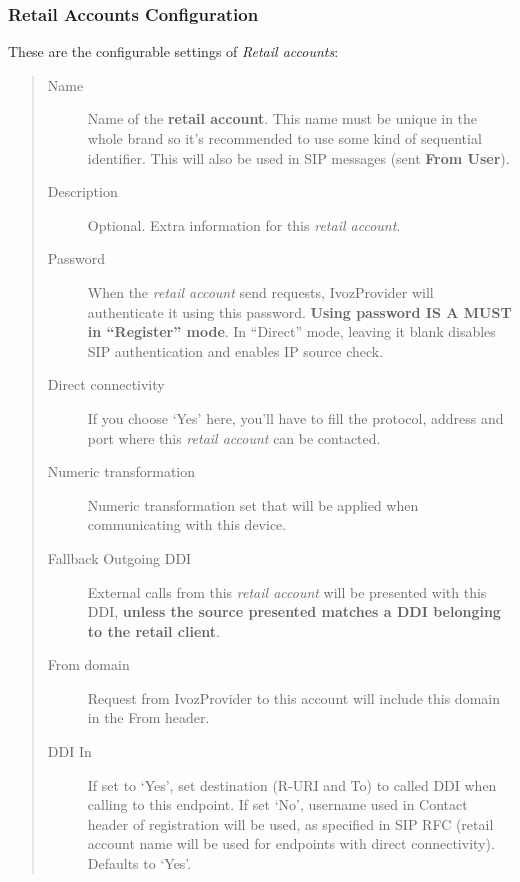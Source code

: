 \documentclass[letterpaper,10pt,spanish]{sphinxmanual}
\begin{document}
\subsubsection{Retail Accounts Configuration}
\label{administration_portal/client/retail/retail_accounts:retail-accounts-configuration}
These are the configurable settings of \emph{Retail accounts}:
\begin{quote}
\begin{description}
\item[{Name}] \leavevmode
Name of the \textbf{retail account}. This name must be unique in the whole brand so
it's recommended to use some kind of sequential identifier. This will also be used
in SIP messages (sent \textbf{From User}).

\item[{Description}] \leavevmode
Optional. Extra information for this \emph{retail account}.

\item[{Password}] \leavevmode
When the \emph{retail account} send requests, IvozProvider will authenticate it using
this password. \textbf{Using password IS A MUST in ``Register'' mode}. In ``Direct'' mode,
leaving it blank disables SIP authentication and enables IP source check.

\item[{Direct connectivity}] \leavevmode
If you choose `Yes' here, you'll have to fill the protocol, address and
port where this \emph{retail account} can be contacted.

\item[{Numeric transformation}] \leavevmode
Numeric transformation set that will be applied when communicating with this device.

\item[{Fallback Outgoing DDI}] \leavevmode
External calls from this \emph{retail account} will be presented with this DDI, \textbf{unless
the source presented matches a DDI belonging to the retail client}.

\item[{From domain}] \leavevmode
Request from IvozProvider to this account will include this domain in
the From header.

\item[{DDI In}] \leavevmode
If set to `Yes', set destination (R-URI and To) to called DDI when calling to this endpoint. If set `No', username
used in Contact header of registration will be used, as specified in SIP RFC (retail account name will be used for
endpoints with direct connectivity). Defaults to `Yes'.


\end{description}
\end{quote}
\end{document}
